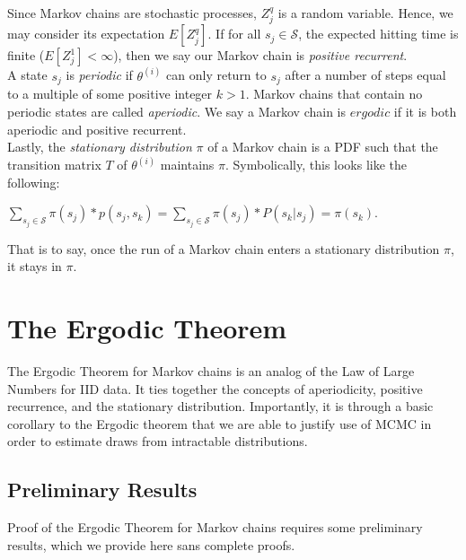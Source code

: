\documentclass[12pt,twoside]{reedthesis}
\begin{document}
		Since Markov chains are stochastic processes, $Z^{q}_j$ is a random variable. Hence, we may consider its expectation $E[Z^{q}_j]$. If for all $s_j \in \mathcal S$, the expected hitting time is finite ($E[Z^{1}_j] < \infty$), then we say our Markov chain is {\em positive recurrent}. \\
		
		A state $s_j$ is {\em periodic} if $\theta^{(i)}$ can only return to $s_j$ after a number of steps equal to a multiple of some positive integer $k > 1$. Markov chains that contain no periodic states are called {\em aperiodic}. We say a Markov chain is $ergodic$ if it is both aperiodic and positive recurrent. \\
		
		Lastly, the {\em stationary distribution} $\pi$ of a Markov chain is a PDF such that the transition matrix $T$ of $\theta^{(i)}$ maintains $\pi$. Symbolically, this looks like the following:
		\begin{center}
			$\displaystyle\sum_{s_j \in \mathcal S} \pi(s_j) * p(s_j,s_k) 
			= \displaystyle\sum_{s_j \in \mathcal S} \pi(s_j) * P(s_k | s_j)
			= \pi(s_k)$.
		\end{center}
		That is to say, once the run of a Markov chain enters a stationary distribution $\pi$, it stays in $\pi$.
		
		
		\section{The Ergodic Theorem}
		The Ergodic Theorem for Markov chains is an analog of the Law of Large Numbers for IID data. It ties together the concepts of aperiodicity, positive recurrence, and the stationary distribution. Importantly, it is through a basic corollary to the Ergodic theorem that we are able to justify use of MCMC in order to estimate draws from intractable distributions.
		\subsection*{Preliminary Results}
		Proof of the Ergodic Theorem for Markov chains requires some preliminary results, which we provide here sans complete proofs.
		
\end{document}
